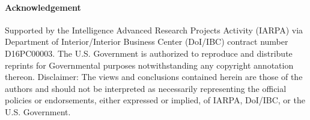 \paragraph{Acknowledgement}
Supported by the Intelligence Advanced Research Projects Activity (IARPA) via Department of
Interior/Interior Business Center (DoI/IBC) contract number D16PC00003. The U.S. Government is
authorized to reproduce and distribute reprints for Governmental purposes notwithstanding any
copyright annotation thereon. Disclaimer: The views and conclusions contained herein are those of
the authors and should not be interpreted as necessarily representing the official policies or
endorsements, either expressed or implied, of IARPA, DoI/IBC, or the U.S. Government.
